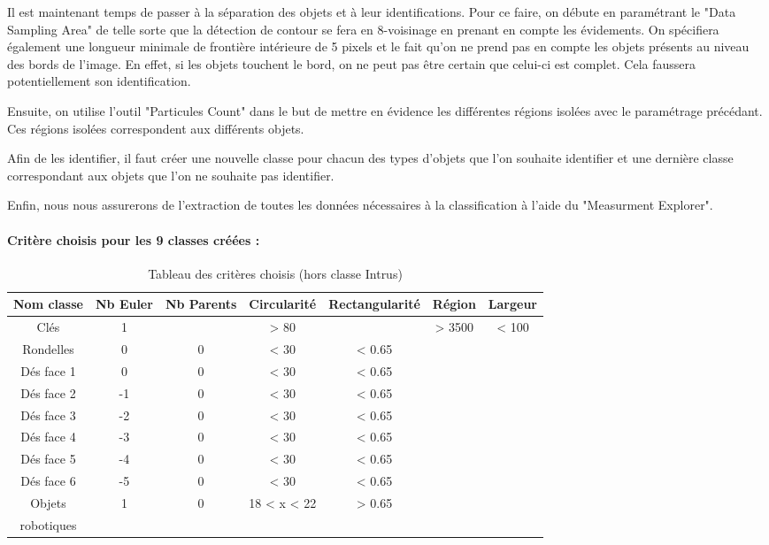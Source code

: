 \documentclass{scrreprt}
\begin{document}
Il est maintenant temps de passer à la séparation des objets et à leur identifications.
Pour ce faire, on débute en paramétrant le "Data Sampling Area" de telle sorte que la 
détection de contour se fera en 8-voisinage en prenant en compte les évidements. On spécifiera 
également une longueur minimale de frontière intérieure de 5 pixels et le fait qu'on ne 
prend pas en compte les objets présents au niveau des bords de l'image. En effet, 
si les objets touchent le bord, on ne peut pas être certain que celui-ci est complet. 
Cela faussera potentiellement son identification. 

Ensuite, on utilise l'outil "Particules Count" dans le but de mettre en évidence les différentes
régions isolées avec le paramétrage précédant. Ces régions isolées correspondent aux différents
objets. 

Afin de les identifier, il faut créer une nouvelle classe pour chacun des types d'objets
que l'on souhaite identifier et une dernière classe correspondant aux objets que l'on ne
souhaite pas identifier. 

Enfin, nous nous assurerons de l'extraction de toutes les données nécessaires à la classification
à l'aide du "Measurment Explorer".

\paragraph{Critère choisis pour les 9 classes créées :}

\begin{table}[!h]
        \begin{center}
                \begin{tabular}{|c|c|c|c|c|c|c|}
                   \hline
                   Nom classe & Nb Euler & Nb Parents & Circularité & Rectangularité & Région &  Largeur \\
                   \hline
		   Clés & 1 & & > 80 & & > 3500 & < 100 \\
		   \hline
		   Rondelles & 0 & 0 & < 30 & < 0.65 & & \\
		   \hline
		   Dés face 1 & 0 & 0 & < 30 & < 0.65 & & \\
		   \hline
                   Dés face 2 & -1 & 0 & < 30 & < 0.65 & & \\
                   \hline
                   Dés face 3 & -2 & 0 & < 30 & < 0.65 & & \\
                   \hline
                   Dés face 4 & -3 & 0 & < 30 & < 0.65 & & \\
                   \hline
                   Dés face 5 & -4 & 0 & < 30 & < 0.65 & & \\
                   \hline
                   Dés face 6 & -5 & 0 & < 30 & < 0.65 & & \\
                   \hline
		   Objets & 1 & 0 &  18 < x < 22 & > 0.65 & & \\
		   robotiques & & & & & &\\
                   \hline 
                \end{tabular}
        \end{center}
        \caption{Tableau des critères choisis (hors classe Intrus)}
\end{table}
  
\end{document}
